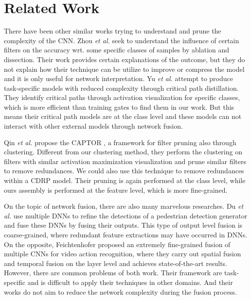 \documentclass[acmsmall,nonacm]{acmart}\settopmatter{}
\begin{document}

\section{Related Work}
There have been other similar works trying to understand and prune the complexity of the CNN.
Zhou \textit{et al.} \cite{zhou2018interpreting} \cite{zhou2018revisiting} seek to understand the influence of certain filters on the accuracy wrt. some specific classes of samples by ablation and dissection.
Their work provides certain explanations of the outcome, but they do not explain how their technique can be utilize to improve or compress the model and it is only useful for network interpretation.
Yu \textit{et al.} \cite{yu2018distilling} attempt to produce task-specific models with reduced complexity through critical path distillation.
They identify critical paths through activation visualization for specific classes, which is more efficient than training gates to find them in our work.
But this means their critical path models are at the class level and these models can not interact with other external models through network fusion.

Qin \textit{et al.} propose the CAPTOR \cite{qin2019captor}, a framework for filter pruning also through clustering.
Different from our clustering method, they perform the clustering on filters with similar activation maximization visualization and prune similar filters to remove redundances.
We could also use this technique to remove redundances within a CDRP model.
Their pruning is again performed at the class level, while ours assembly is performed at the feature level, which is more fine-grained.

On the topic of network fusion, there are also many marvelous researches.
Du \textit{et al.} \cite{du2017fused} use multiple DNNs to refine the detections of a pedestrian detection generator and fuse these DNNs by fusing their outputs.
This type of output level fusion is coarse-grained, where redundant feature extractions may have occurred in DNNs.
On the opposite, Feichtenhofer\cite{feichtenhofer2016convolutional} proposed an extremely fine-grained fusion of multiple CNNs for video action recognition, where they carry out spatial fusion and temporal fusion on the layer level and achieves state-of-the-art results.
However, there are common problems of both work.
Their framework are task-specific and is difficult to apply their techniques in other domains.
And their works do not aim to reduce the network complexity during the fusion process.
\end{document}
